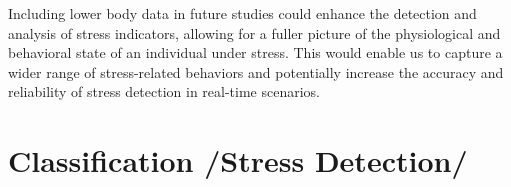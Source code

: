 Including lower body data in future studies could enhance the detection and analysis of stress indicators, allowing for a fuller picture of the physiological and behavioral state of an individual under stress. This would enable us to capture a wider range of stress-related behaviors and potentially increase the accuracy and reliability of stress detection in real-time scenarios.
\section{Classification /Stress Detection/}
